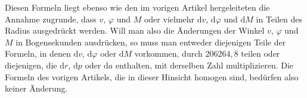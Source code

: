 Diesen Formeln liegt ebenso wie den im vorigen Artikel hergeleiteten die Annahme zugrunde, dass $v$, $\varphi$ und $M$ oder vielmehr $\mathrm{d}v$, $\mathrm{d}\varphi$ und $\mathrm{d}M$ in Teilen des Radius ausgedrückt werden. Will man also die Änderungen der Winkel $v$, $\varphi$ und $M$ in Bogensekunden ausdrücken, so muss man entweder diejenigen Teile der Formeln, in denen $\mathrm{d}v$, $\mathrm{d}\varphi$ oder $\mathrm{d}M$ vorkommen, durch $206264{,}8$ teilen oder diejenigen, die $\mathrm{d}r$, $\mathrm{d}p$ oder $\mathrm{d}a$ enthalten, mit derselben Zahl multiplizieren. Die Formeln des vorigen Artikels, die in dieser Hinsicht homogen sind, bedürfen also keiner Änderung.
